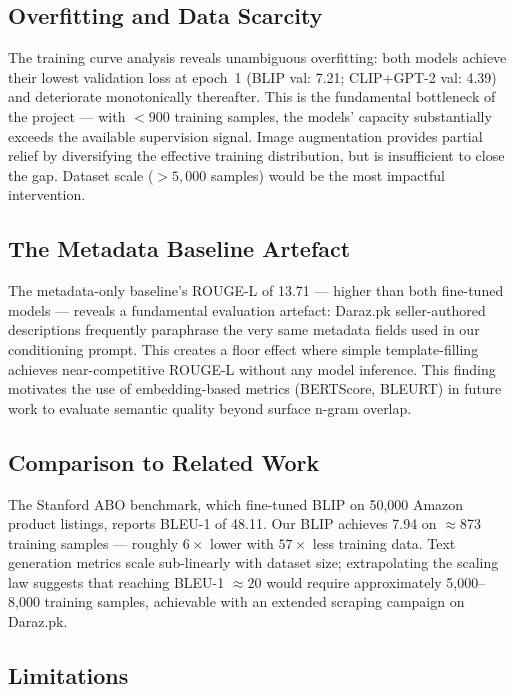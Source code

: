 \documentclass[12pt,a4paper]{article}
\begin{document}
\subsection{Overfitting and Data Scarcity}

The training curve analysis reveals unambiguous overfitting: both models achieve their
lowest validation loss at epoch~1 (BLIP val: 7.21; CLIP+GPT-2 val: 4.39) and
deteriorate monotonically thereafter. This is the fundamental bottleneck of the project
--- with $<900$ training samples, the models' capacity substantially exceeds the
available supervision signal. Image augmentation provides partial relief by diversifying
the effective training distribution, but is insufficient to close the gap. Dataset
scale ($>5{,}000$ samples) would be the most impactful intervention.

\subsection{The Metadata Baseline Artefact}

The metadata-only baseline's ROUGE-L of 13.71 --- higher than both fine-tuned models
--- reveals a fundamental evaluation artefact: Daraz.pk seller-authored descriptions
frequently paraphrase the very same metadata fields used in our conditioning prompt.
This creates a floor effect where simple template-filling achieves near-competitive
ROUGE-L without any model inference. This finding motivates the use of embedding-based
metrics (BERTScore, BLEURT) in future work to evaluate semantic quality beyond surface
n-gram overlap.

\subsection{Comparison to Related Work}

The Stanford ABO benchmark, which fine-tuned BLIP on 50,000 Amazon product listings,
reports BLEU-1 of 48.11. Our BLIP achieves 7.94 on $\approx$873 training samples ---
roughly $6\times$ lower with $57\times$ less training data. Text generation metrics
scale sub-linearly with dataset size; extrapolating the scaling law suggests that
reaching BLEU-1 $\approx 20$ would require approximately 5,000--8,000 training samples,
achievable with an extended scraping campaign on Daraz.pk.

\subsection{Limitations}\label{sec:limitations}
\end{document}
